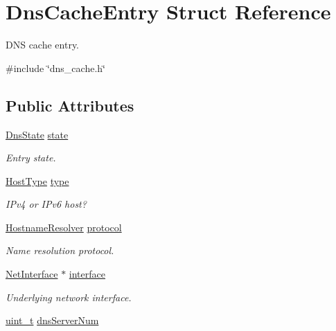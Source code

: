 \hypertarget{structDnsCacheEntry}{}\section{Dns\+Cache\+Entry Struct Reference}
\label{structDnsCacheEntry}


D\+NS cache entry.  




{\ttfamily \#include \char`\"{}dns\+\_\+cache.\+h\char`\"{}}

\subsection*{Public Attributes}
\begin{DoxyCompactItemize}
\item 
\hyperlink{dns__cache_8h_a57ef307e25adab4205cf584115875ef3}{Dns\+State} \hyperlink{structDnsCacheEntry_ac0f0a02b2f1fece9d83ec3345bb618c0}{state}
\begin{DoxyCompactList}\small\item\em Entry state. \end{DoxyCompactList}\item 
\hyperlink{socket_8h_ab5e32e6fb9dfb43706584ab98de9a7bd}{Host\+Type} \hyperlink{structDnsCacheEntry_a5520082c9b81d8244f858641785ac01e}{type}
\begin{DoxyCompactList}\small\item\em I\+Pv4 or I\+Pv6 host? \end{DoxyCompactList}\item 
\hyperlink{socket_8h_adb58068eb0cfd0e54798ac480eb19f94}{Hostname\+Resolver} \hyperlink{structDnsCacheEntry_aeb800b57a9593f4749e3ae8ac03f4a71}{protocol}
\begin{DoxyCompactList}\small\item\em Name resolution protocol. \end{DoxyCompactList}\item 
\hyperlink{net_8h_a2234db8911a1148c9159979d8f5e0d6b}{Net\+Interface} $\ast$ \hyperlink{structDnsCacheEntry_ad0d0a0228fc29308f59f4b2d402758e6}{interface}
\begin{DoxyCompactList}\small\item\em Underlying network interface. \end{DoxyCompactList}\item 
\hyperlink{compiler__port_8h_a12a1e9b3ce141648783a82445d02b58d}{uint\+\_\+t} \hyperlink{structDnsCacheEntry_a64c746516176b9ecc93492623e951a5c}{dns\+Server\+Num}

\end{DoxyCompactItemize}
